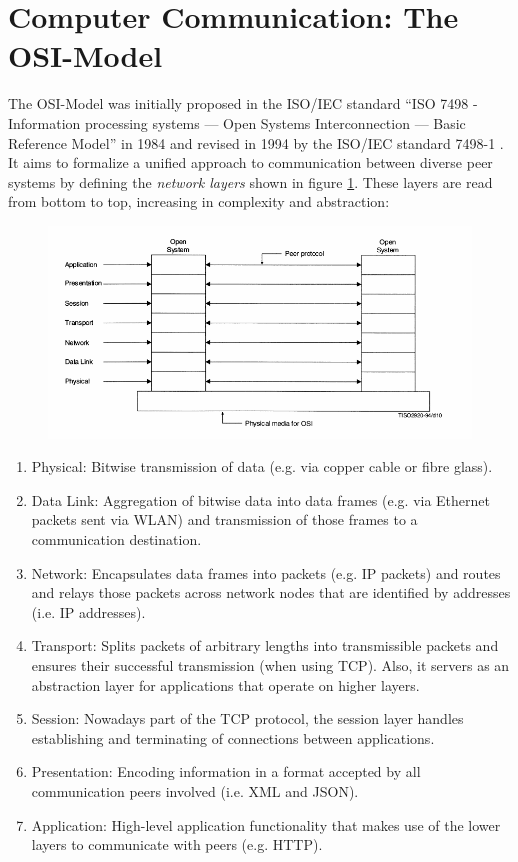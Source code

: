 \section{Computer Communication: The OSI-Model}
\label{sec:computer-networks}
The \ac{OSI}-Model was initially proposed in the \ac{ISO}/\ac{IEC} standard \enquote{\ac{ISO} 7498 - Information processing systems — Open Systems Interconnection — Basic Reference Model} in 1984 and revised in 1994 by the \ac{ISO}/\ac{IEC} standard 7498-1 \cite{ISOIEC74981}. It aims to formalize a unified approach to communication between diverse peer systems by defining the \emph{network layers} shown in figure \ref{fig:osi-model}. These layers are read from bottom to top, increasing in complexity and abstraction:
\begin{figure}[h!]
    \centering
    \includegraphics[width=14cm]{img/ch03/osi-model.png}
    \label{fig:osi-model}
\end{figure}
\begin{enumerate}
    \item Physical: Bitwise transmission of data (e.g. via copper cable or fibre glass).
    \item Data Link: Aggregation of bitwise data into data frames (e.g. via Ethernet packets sent via \ac{WLAN}) and transmission of those frames to a communication destination.
    \item Network: Encapsulates data frames into packets (e.g. \ac{IP} packets) and routes and relays those packets across network nodes that are identified by addresses (i.e. \ac{IP} addresses).
    \item Transport: Splits packets of arbitrary lengths into transmissible packets and ensures their successful transmission (when using \ac{TCP}). Also, it servers as an abstraction layer for applications that operate on higher layers.
    \item Session: Nowadays part of the \ac{TCP} protocol, the session layer handles establishing and terminating of connections between applications.
    \item Presentation: Encoding information in a format accepted by all communication peers involved (i.e. \ac{XML} and \ac{JSON}).
    \item Application: High-level application functionality that makes use of the lower layers to communicate with peers (e.g. \ac{HTTP}).
\end{enumerate}

